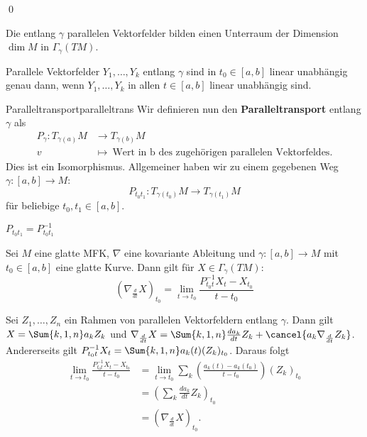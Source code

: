\qed
\begin{korollar}{}{}
Die entlang $\gamma$ parallelen Vektorfelder bilden einen Unterraum der Dimension $\dim M$ in $\Gamma_\gamma (TM)$.
\end{korollar}
\begin{korollar}{}{}
Parallele Vektorfelder $Y_1, \dots, Y_k$ entlang $\gamma$ sind in $t_0 \in [a,b]$ linear unabhängig genau dann, wenn $Y_1, \dots, Y_k$ in allen $t \in [a,b]$ linear unabhängig sind.
\end{korollar}
\begin{definition}{Paralleltransport}{paralleltrans}
Wir definieren nun den \textbf{Paralleltransport} entlang $\gamma$ als
\begin{align}
P_\gamma: T_{\gamma(a)} M &\to T_{\gamma(b)} M \\
v &\mapsto \ \text{Wert in b des zugehörigen parallelen Vektorfeldes}.
\end{align}
Dies ist ein Isomorphismus.
Allgemeiner haben wir zu einem gegebenen Weg $\gamma: [a,b] \to M$:
\begin{equation}
P_{t_0t_1}: T_{\gamma(t_0)} M \to T_{\gamma(t_1)}M
\end{equation}
für beliebige $t_0, t_1 \in [a,b]$.
\end{definition}
\begin{bemerkung}
$P_{t_0t_1} = P_{t_0t_1}^{-1}$
\end{bemerkung}
\begin{satz}{}{}
Sei $M$ eine glatte MFK, $\nabla$ eine kovariante Ableitung und $\gamma: [a,b] \to M$ mit $t_0 \in [a,b]$ eine glatte Kurve. Dann gilt für $X \in \Gamma_\gamma (TM)$:
\begin{equation}
(\nabla_\frac{d}{dt}X)_{t_0} = \lim_{t \to t_0} \frac{P_{t_0t}^{-1} X_t - X_{t_0}}{t-t_0}
\end{equation}
\end{satz}
\begin{beweis}
Sei $Z_1, \dots, Z_n$ ein Rahmen von parallelen Vektorfeldern entlang $\gamma$. Dann gilt $X = \Sum{k,1,n} a_k Z_k$ und $\nabla_\frac{d}{dt} X = \Sum{k,1,n} \frac{d a_k}{dt} Z_k + \cancel{a_k \nabla_\frac{d}{dt} Z_k}$. Andererseits gilt $P_{t_0t}^{-1} X_t = \Sum{k,1,n} a_k(t) (Z_k)_{t_0}$. Daraus folgt
\begin{align}
\lim_{t \to t_0} \frac{P_{t_0t}^{-1} X_t - X_{t_0}}{t-t_0} &= \lim_{t \to t_0} \sum_k \left( \frac{a_k(t) - a_k(t_0)}{t-t_0} \right) (Z_k)_{t_0} \\
&= \left( \sum_k \frac{d a_k}{dt} Z_k\right)_{t_0} \\
&= \left( \nabla_\frac{d}{dt} X\right)_{t_0}.
\end{align}
\end{beweis}
